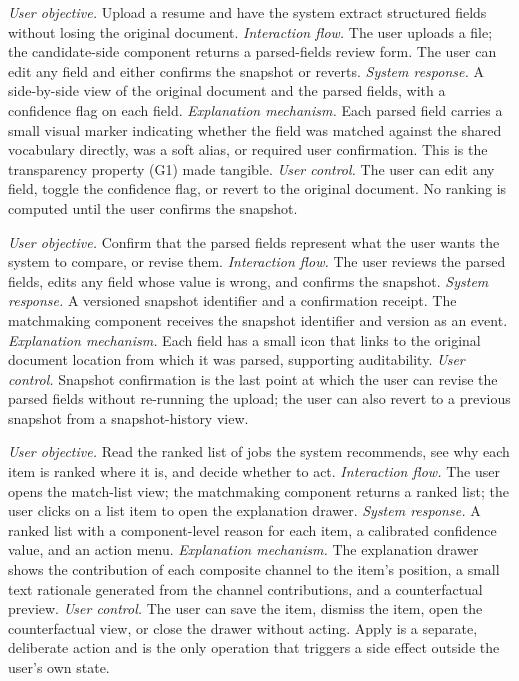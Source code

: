 \emph{User objective.} Upload a resume and have the system extract structured fields without losing the original document.
\emph{Interaction flow.} The user uploads a file; the candidate-side component returns a parsed-fields review form. The user can edit any field and either confirms the snapshot or reverts.
\emph{System response.} A side-by-side view of the original document and the parsed fields, with a confidence flag on each field.
\emph{Explanation mechanism.} Each parsed field carries a small visual marker indicating whether the field was matched against the shared vocabulary directly, was a soft alias, or required user confirmation. This is the transparency property (G1) made tangible.
\emph{User control.} The user can edit any field, toggle the confidence flag, or revert to the original document. No ranking is computed until the user confirms the snapshot.

\emph{User objective.} Confirm that the parsed fields represent what the user wants the system to compare, or revise them.
\emph{Interaction flow.} The user reviews the parsed fields, edits any field whose value is wrong, and confirms the snapshot.
\emph{System response.} A versioned snapshot identifier and a confirmation receipt. The matchmaking component receives the snapshot identifier and version as an event.
\emph{Explanation mechanism.} Each field has a small icon that links to the original document location from which it was parsed, supporting auditability.
\emph{User control.} Snapshot confirmation is the last point at which the user can revise the parsed fields without re-running the upload; the user can also revert to a previous snapshot from a snapshot-history view.

\emph{User objective.} Read the ranked list of jobs the system recommends, see why each item is ranked where it is, and decide whether to act.
\emph{Interaction flow.} The user opens the match-list view; the matchmaking component returns a ranked list; the user clicks on a list item to open the explanation drawer.
\emph{System response.} A ranked list with a component-level reason for each item, a calibrated confidence value, and an action menu.
\emph{Explanation mechanism.} The explanation drawer shows the contribution of each composite channel to the item's position, a small text rationale generated from the channel contributions, and a counterfactual preview.
\emph{User control.} The user can save the item, dismiss the item, open the counterfactual view, or close the drawer without acting. Apply is a separate, deliberate action and is the only operation that triggers a side effect outside the user's own state.

